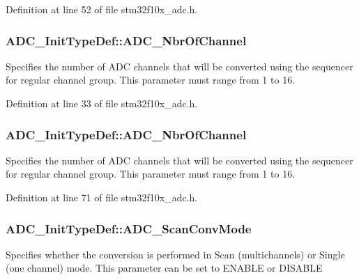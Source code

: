 Definition at line 52 of file stm32f10x\+\_\+adc.\+h.

\subsubsection[{\texorpdfstring{A\+D\+C\+\_\+\+Nbr\+Of\+Channel}{ADC_NbrOfChannel}}]{ A\+D\+C\+\_\+\+Init\+Type\+Def\+::\+A\+D\+C\+\_\+\+Nbr\+Of\+Channel}\hypertarget{struct_a_d_c___init_type_def_aa7c965459c14f15b1143cfc24ba1ebe9}{}\label{struct_a_d_c___init_type_def_aa7c965459c14f15b1143cfc24ba1ebe9}
Specifies the number of A\+DC channels that will be converted using the sequencer for regular channel group. This parameter must range from 1 to 16. 

Definition at line 33 of file stm32f10x\+\_\+adc.\+h.

\subsubsection[{\texorpdfstring{A\+D\+C\+\_\+\+Nbr\+Of\+Channel}{ADC_NbrOfChannel}}]{ A\+D\+C\+\_\+\+Init\+Type\+Def\+::\+A\+D\+C\+\_\+\+Nbr\+Of\+Channel}\hypertarget{struct_a_d_c___init_type_def_ad6f39a12ac32a2767085ac94e9338bc3}{}\label{struct_a_d_c___init_type_def_ad6f39a12ac32a2767085ac94e9338bc3}
Specifies the number of A\+DC channels that will be converted using the sequencer for regular channel group. This parameter must range from 1 to 16. 

Definition at line 71 of file stm32f10x\+\_\+adc.\+h.

\subsubsection[{\texorpdfstring{A\+D\+C\+\_\+\+Scan\+Conv\+Mode}{ADC_ScanConvMode}}]{ A\+D\+C\+\_\+\+Init\+Type\+Def\+::\+A\+D\+C\+\_\+\+Scan\+Conv\+Mode}\hypertarget{struct_a_d_c___init_type_def_aaf44f54f22ab40bf8fae01f075aa4c87}{}\label{struct_a_d_c___init_type_def_aaf44f54f22ab40bf8fae01f075aa4c87}
Specifies whether the conversion is performed in Scan (multichannels) or Single (one channel) mode. This parameter can be set to E\+N\+A\+B\+LE or D\+I\+S\+A\+B\+LE 

